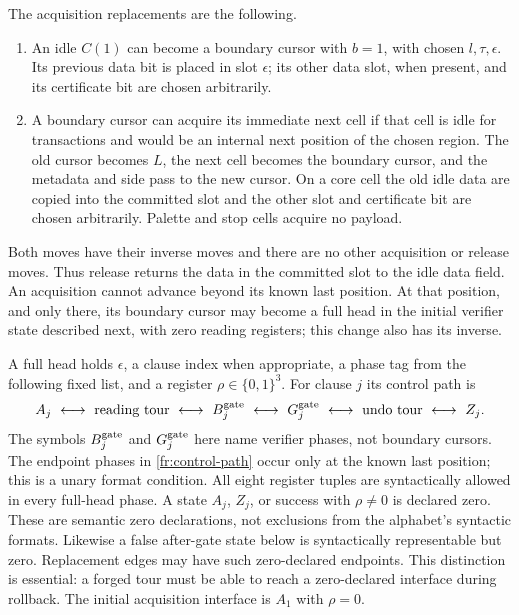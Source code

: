 The acquisition replacements are the following.
\begin{enumerate}
\item An idle $C(1)$ can become a boundary cursor with $b=1$, with
chosen $l,\tau,\epsilon$.  Its previous data bit is placed in slot
$\epsilon$; its other data slot, when present, and its certificate
bit are chosen arbitrarily.
\item A boundary cursor can acquire its immediate next cell if that
cell is idle for transactions and would be an internal next position
of the chosen region.  The old cursor becomes $L$, the next cell
becomes the boundary cursor, and the metadata and side pass to the
new cursor.  On a core cell the old idle data are copied into the
committed slot and the other slot and certificate bit are chosen
arbitrarily.  Palette and stop cells acquire no payload.
\end{enumerate}
Both moves have their inverse moves and there are no other
acquisition or release moves.  Thus release returns the data in the
committed slot to the idle data field.  An acquisition cannot advance
beyond its known last position.  At that position, and only there,
its boundary cursor may become a full head in the initial verifier
state described next, with zero reading registers; this change also
has its inverse.

A full head holds $\epsilon$, a clause index when appropriate, a
phase tag from the following fixed list, and a register
$\rho\in\{0,1\}^3$.  For clause $j$ its control path is
\begin{equation}\label{fr:control-path}
 A_j\ \longleftrightarrow\
 \text{reading tour}\ \longleftrightarrow\ B_j^{\rm gate}
 \ \longleftrightarrow\ G_j^{\rm gate}
 \ \longleftrightarrow\ \text{undo tour}
 \ \longleftrightarrow\ Z_j.
\end{equation}
The symbols $B_j^{\rm gate}$ and $G_j^{\rm gate}$ here name verifier
phases, not boundary cursors.  The endpoint phases in
\eqref{fr:control-path} occur only at the known last position; this
is a unary format condition.  All eight register tuples are
syntactically allowed in every full-head phase.  A state $A_j$, $Z_j$,
or success with $\rho\ne0$ is declared zero.  These are semantic zero
declarations, not exclusions from the alphabet's syntactic formats.
Likewise a false after-gate state below is syntactically representable
but zero.  Replacement edges may have such zero-declared endpoints.
This distinction is essential: a forged tour must be able to reach a
zero-declared interface during rollback.  The initial acquisition
interface is $A_1$ with $\rho=0$.

